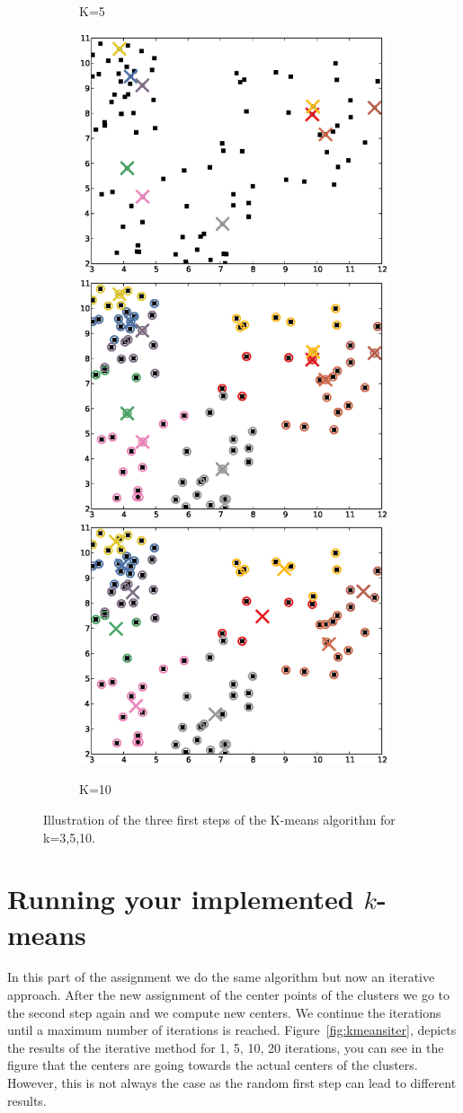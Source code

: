 \documentclass[a4paper,10pt,twoside]{article}
\begin{document}
\begin{figure}
\begin{subfigure}{1.00\textwidth}
    \caption{K=5}
  \end{subfigure}
  \begin{subfigure}{1.00\textwidth}
    \centering
    \includegraphics[width=.32\textwidth,height=.3\textheight,keepaspectratio]{figure_7.eps}
    \includegraphics[width=.32\textwidth,height=.3\textheight,keepaspectratio]{figure_8.eps}
    \includegraphics[width=.32\textwidth,height=.3\textheight,keepaspectratio]{figure_9.eps}
    \caption{K=10}
  \end{subfigure}
  \caption{Illustration of the three first steps of the K-means algorithm for k=3,5,10.}
  \label{fig:kmeanssimple}
\end{figure}

\section{Running your implemented $k$-means}
In this part of the assignment we do the same algorithm but now an iterative approach. After the new assignment of the center points of the clusters we go to the second step again and we compute new centers. We continue the iterations until a maximum number of iterations is reached. Figure~\ref{fig:kmeansiter}, depicts the results of the iterative method for 1, 5, 10, 20 iterations, you can see in the figure that the centers are going towards the actual centers of the clusters. However, this is not always the case as the random first step can lead to different results.
\end{document}
